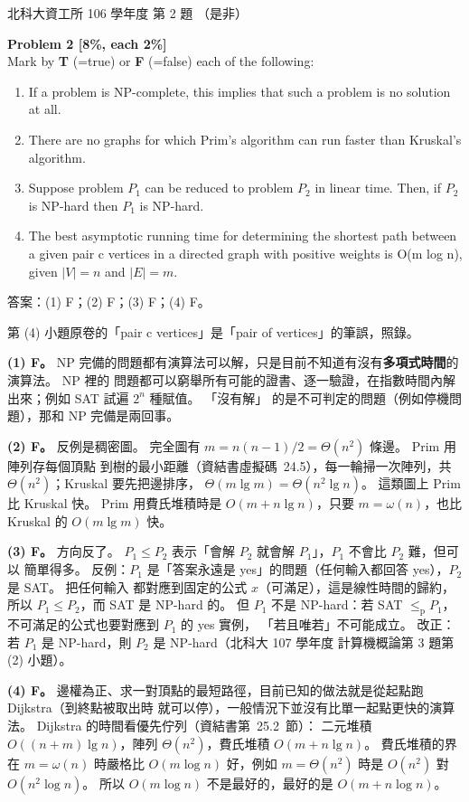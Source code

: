 \begin{pastexam}[label={px:ntut-106-prog-02}]{北科大資工所 106 學年度 第 2 題}
（是非）

\textbf{Problem 2 [8\%, each 2\%]}\\
Mark by \textbf{T} (=true) or \textbf{F} (=false) each of the following:
\begin{enumerate}[label=(\arabic*)]
\item If a problem is NP-complete, this implies that such a problem is no solution at all.
\item There are no graphs for which Prim's algorithm can run faster than Kruskal's algorithm.
\item Suppose problem $P_1$ can be reduced to problem $P_2$ in linear time. Then, if $P_2$ is
NP-hard then $P_1$ is NP-hard.
\item The best asymptotic running time for determining the shortest path between a given pair c
vertices in a directed graph with positive weights is O(m log n), given $|V|=n$ and $|E|=m$.
\end{enumerate}
\end{pastexam}

\begin{pastsoln}
答案：(1) F；(2) F；(3) F；(4) F。

第 (4) 小題原卷的「pair c vertices」是「pair of vertices」的筆誤，照錄。

\textbf{(1) F。} NP 完備的問題都有演算法可以解，只是目前不知道有沒有\textbf{多項式時間}的演算法。 NP 裡的
問題都可以窮舉所有可能的證書、逐一驗證，在指數時間內解出來；例如 SAT 試遍 $2^n$ 種賦值。 「沒有解」
的是不可判定的問題（例如停機問題），那和 NP 完備是兩回事。

\textbf{(2) F。} 反例是稠密圖。 完全圖有 $m = n(n-1)/2 = \Theta(n^2)$ 條邊。 Prim 用陣列存每個頂點
到樹的最小距離（資結書虛擬碼~24.5），每一輪掃一次陣列，共 $\Theta(n^2)$；Kruskal 要先把邊排序，
$\Theta(m \lg m) = \Theta(n^2 \lg n)$。 這類圖上 Prim 比 Kruskal 快。 Prim 用費氏堆積時是
$O(m + n \lg n)$，只要 $m = \omega(n)$，也比 Kruskal 的 $O(m \lg m)$ 快。

\textbf{(3) F。} 方向反了。 $P_1 \le P_2$ 表示「會解 $P_2$ 就會解 $P_1$」，$P_1$ 不會比 $P_2$ 難，但可以
簡單得多。 反例：$P_1$ 是「答案永遠是 yes」的問題（任何輸入都回答 yes），$P_2$ 是 SAT。 把任何輸入
都對應到固定的公式 $x$（可滿足），這是線性時間的歸約，所以 $P_1 \le P_2$，而 SAT 是 NP-hard 的。
但 $P_1$ 不是 NP-hard：若 SAT $\le_{\mathrm p} P_1$，不可滿足的公式也要對應到 $P_1$ 的 yes 實例，
「若且唯若」不可能成立。 改正：若 $P_1$ 是 NP-hard，則 $P_2$ 是 NP-hard（北科大 107 學年度
計算機概論第 3 題第 (2) 小題）。

\textbf{(4) F。} 邊權為正、求一對頂點的最短路徑，目前已知的做法就是從起點跑 Dijkstra（到終點被取出時
就可以停），一般情況下並沒有比單一起點更快的演算法。 Dijkstra 的時間看優先佇列（資結書第~25.2~節）：
二元堆積 $O((n + m) \lg n)$，陣列 $\Theta(n^2)$，費氏堆積 $O(m + n \lg n)$。 費氏堆積的界在
$m = \omega(n)$ 時嚴格比 $O(m \log n)$ 好，例如 $m = \Theta(n^2)$ 時是 $O(n^2)$ 對 $O(n^2 \log n)$。
所以 $O(m \log n)$ 不是最好的，最好的是 $O(m + n \log n)$。
\end{pastsoln}
